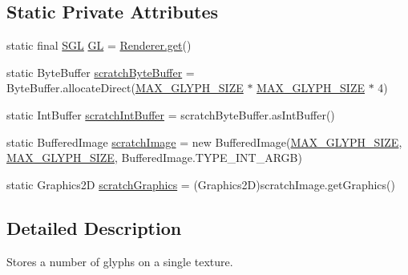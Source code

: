 \subsection*{Static Private Attributes}
\begin{DoxyCompactItemize}
\item 
static final \mbox{\hyperlink{interfaceorg_1_1newdawn_1_1slick_1_1opengl_1_1renderer_1_1_s_g_l}{S\+GL}} \mbox{\hyperlink{classorg_1_1newdawn_1_1slick_1_1font_1_1_glyph_page_a5d5c2f94f75d77839cd0715607d326cc}{GL}} = \mbox{\hyperlink{classorg_1_1newdawn_1_1slick_1_1opengl_1_1renderer_1_1_renderer_abe742c3a7dfca67c6c01821d27087308}{Renderer.\+get}}()
\item 
static Byte\+Buffer \mbox{\hyperlink{classorg_1_1newdawn_1_1slick_1_1font_1_1_glyph_page_a08e07e05a984560722f01af927f205c5}{scratch\+Byte\+Buffer}} = Byte\+Buffer.\+allocate\+Direct(\mbox{\hyperlink{classorg_1_1newdawn_1_1slick_1_1font_1_1_glyph_page_ac45492a4d734e35753d7fa4f7730e5c1}{M\+A\+X\+\_\+\+G\+L\+Y\+P\+H\+\_\+\+S\+I\+ZE}} $\ast$ \mbox{\hyperlink{classorg_1_1newdawn_1_1slick_1_1font_1_1_glyph_page_ac45492a4d734e35753d7fa4f7730e5c1}{M\+A\+X\+\_\+\+G\+L\+Y\+P\+H\+\_\+\+S\+I\+ZE}} $\ast$ 4)
\item 
static Int\+Buffer \mbox{\hyperlink{classorg_1_1newdawn_1_1slick_1_1font_1_1_glyph_page_a1ca850b88627ce8b0d534f80b797ec51}{scratch\+Int\+Buffer}} = scratch\+Byte\+Buffer.\+as\+Int\+Buffer()
\item 
static Buffered\+Image \mbox{\hyperlink{classorg_1_1newdawn_1_1slick_1_1font_1_1_glyph_page_a4151d180856eeb907b906dde31e7f93f}{scratch\+Image}} = new Buffered\+Image(\mbox{\hyperlink{classorg_1_1newdawn_1_1slick_1_1font_1_1_glyph_page_ac45492a4d734e35753d7fa4f7730e5c1}{M\+A\+X\+\_\+\+G\+L\+Y\+P\+H\+\_\+\+S\+I\+ZE}}, \mbox{\hyperlink{classorg_1_1newdawn_1_1slick_1_1font_1_1_glyph_page_ac45492a4d734e35753d7fa4f7730e5c1}{M\+A\+X\+\_\+\+G\+L\+Y\+P\+H\+\_\+\+S\+I\+ZE}}, Buffered\+Image.\+T\+Y\+P\+E\+\_\+\+I\+N\+T\+\_\+\+A\+R\+GB)
\item 
static Graphics2D \mbox{\hyperlink{classorg_1_1newdawn_1_1slick_1_1font_1_1_glyph_page_a493fd684bdaaf07f0e15d00e4e173391}{scratch\+Graphics}} = (Graphics2D)scratch\+Image.\+get\+Graphics()
\end{DoxyCompactItemize}


\subsection{Detailed Description}
Stores a number of glyphs on a single texture.

